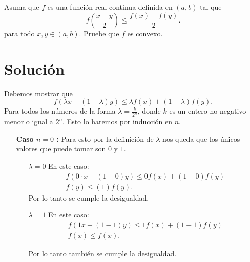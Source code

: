 \documentclass{report}
\begin{document}
Asuma que $f$ es una función real continua definida en $\left( a, b \right) $ tal que \[
f\left( \frac{x + y}{2} \right) \le \frac{f(x) + f(y)}{2}
.\] para todo $x, y \in \left( a,b \right) $. Pruebe que $f$ es convexo.

\section{Solución}

Debemos mostrar que  \[
f\left( \lambda x + \left( 1 - \lambda \right) y \right) \le \lambda f\left( x \right) + \left( 1 - \lambda \right) f\left( y \right) 
.\] Para todos los números de la forma $\lambda = \frac{k}{2^{n}}$, donde $k$ es un entero no negativo menor o igual a $2^{n}$. Esto lo haremos por inducción en $n$.

\begin{enumerate}
  \item[\textbf{Caso $n = 0$ :}] Para esto por la definición de $\lambda$ nos queda que los únicos valores que puede tomar son  $0$ y $1$.
    \begin{enumerate}
      \item[$\lambda = 0$] En este caso:
	\begin{align*}
	  f\left( 0\cdot x + \left( 1 - 0 \right) y \right) \le 0 f\left( x \right) + \left( 1 - 0 \right) f\left( y \right) \\
	  f\left( y \right) \le \left( 1 \right) f\left( y \right) 
	.\end{align*}
	Por lo tanto se cumple la desigualdad.
      \item[$\lambda = 1$ ] En este caso:
	\begin{align*}
	  f\left( 1 x + \left( 1 - 1 \right) y \right) \le 1 f\left( x \right) + \left( 1 - 1 \right) f\left( y \right) \\
	  f\left( x \right) \le f\left( x \right) 
	.\end{align*}

	Por lo tanto también se cumple la desigualdad.
    \end{enumerate}


\end{enumerate}
\end{document}
